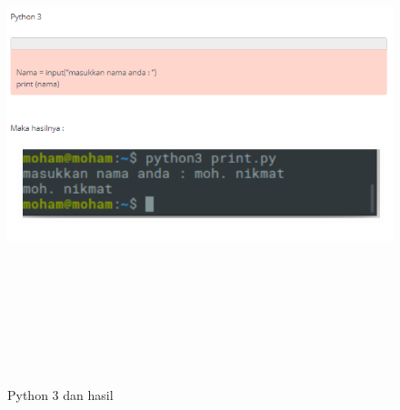 \begin{enumerate}
\begin{figure}[!htbp]
\centering
\includegraphics[width=15cm,height=15cm]{figures/4.PNG}
\caption{Python 3 dan hasil}
\label{penanda}
\end{figure}


\end{enumerate}
